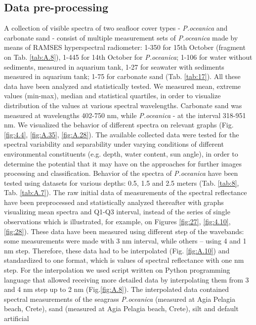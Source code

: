 \documentclass[10pt, a4paper]{article}
\begin{document}
\subsection{Data pre-processing}
A collection of visible spectra of two seafloor cover types - \textit{P.oceanica} and carbonate sand - consist of multiple measurement sets of \textit{P.oceanica} made by means of RAMSES hyperspectral radiometer: 1-350 for 15th October (fragment on Tab. \ref{tab:A.8}), 1-445 for 14th October for 	\textit{P.oceanica}; 1-106 for water without sediments, measured in aquarium tank, 1-27 for seawater with sediments measured in aquarium tank; 1-75 for carbonate sand (Tab. \ref{tab:17}). All these data have been analyzed and statistically tested. We measured mean, extreme values (min-max), median and statistical quartiles, in order to visualize distribution of the values at various spectral wavelengths. Carbonate sand was measured at wavelengths 402-750 nm, while \textit{P.oceanica} - at the interval 318-951 nm. We visualized the behavior of different spectra on relevant graphs (Fig. \ref{fig:4.4}, \ref{fig:A.35}, \ref{fig:A.28}). 
The available collected data were tested for the spectral variability and separability under varying conditions of different environmental
constituents (e.g. depth, water content, sun angle), in order to determine the
potential that it may have on the approaches for further images processing and classification. Behavior of the spectra of \textit{P.oceanica} have been tested using datasets for various depths: 0.5, 1.5 and 2.5 meters (Tab. \ref{tab:8}, Tab. \ref{tab:A.7}). The raw
initial data of measurements of the spectral reflectance have been preprocessed and statistically analyzed thereafter with graphs visualizing mean spectra and Q1-Q3 interval, instead of the series of single observations which is illustrated, for example, on Figures \ref{fig:27}, \ref{fig:4.10}, \ref{fig:28}). These data
have been measured using different step of the wavebands: some measurements
were made with 3 nm interval, while others – using 4 and 1 nm step.
Therefore, these data had to be interpolated (Fig. \ref{fig:A.10}) and standardized to one
format, which is values of spectral reflectance with one nm step. For the
interpolation we used script written on Python programming language that allowed receiving more 
detailed data by interpolating them from 3 and 4 nm step up to 2 nm (Fig.\ref{fig:A.8}).
The interpolated data contained spectral measurements of the seagrass 	\textit{P.oceanica} (measured at Agia
Pelagia beach, Crete), sand (measured at Agia Pelagia beach, Crete), silt and default artificial
\end{document}
